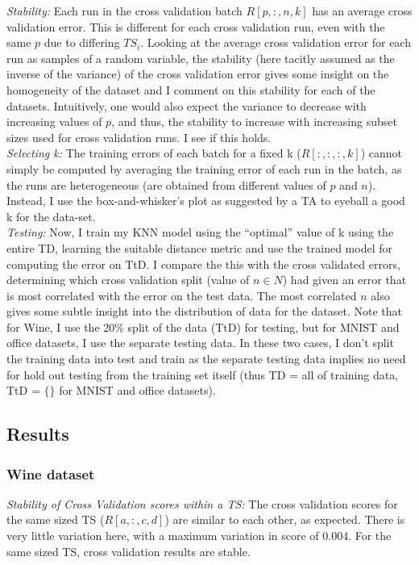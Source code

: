 \documentclass[5pt]{article}
\begin{document}
\noindent \emph{Stability:} Each run in the cross validation batch $R[p,:,n,k]$
has an average cross validation error. This is different for each cross
validation run, even with the same $p$ due to differing $TS_i$. Looking at the
average cross validation error for each run as samples of a random variable,
the stability (here tacitly assumed as the inverse of the variance) of the
cross validation error gives some insight on the homogeneity of the dataset and
I comment on this stability for each of the datasets. Intuitively, one would
also expect the variance to decrease with increasing values of $p$, and thus,
the stability to increase with increasing subset sizes used for cross
validation runs. I see if this holds.\\

\noindent \emph{Selecting k:}
The training errors of each batch for a fixed k ($R[:,:,:,k]$) cannot simply be
computed by averaging the training error of each run in the batch, as the runs
are heterogeneous (are obtained from different values of $p$ and $n$). Instead,
I use the box-and-whisker's plot as suggested by a TA to eyeball a good k for
the data-set.\\

\noindent \emph{Testing:}
Now, I train my KNN model using the ``optimal'' value of k using the
entire TD, learning the suitable distance metric and use the trained model for
computing the error on TtD. I compare the this with the cross validated errors,
determining which cross validation split (value of $n \in N$) had given an error
that is most correlated with the error on the test data. The most correlated
$n$ also gives some subtle insight into the distribution of data for the
dataset. Note that for Wine, I use the 20\% split of the data (TtD) for
testing, but for MNIST and office datasets, I use the separate testing data. In
these two cases, I don't split the training data into test and train as the
separate testing data implies no need for hold out testing from the training
set itself (thus TD = all of training data, TtD = $\{\}$ for MNIST and office
datasets).

\subsection{Results}
\subsubsection{Wine dataset}
\noindent \emph{Stability of Cross Validation scores within a TS:}
The cross validation scores for the same sized TS ($R[a,:,c,d]$) are similar to
each other, as expected. There is very little variation here, with a maximum
variation in score of 0.004. For the same sized TS, cross validation results
are stable.\\
\end{document}
